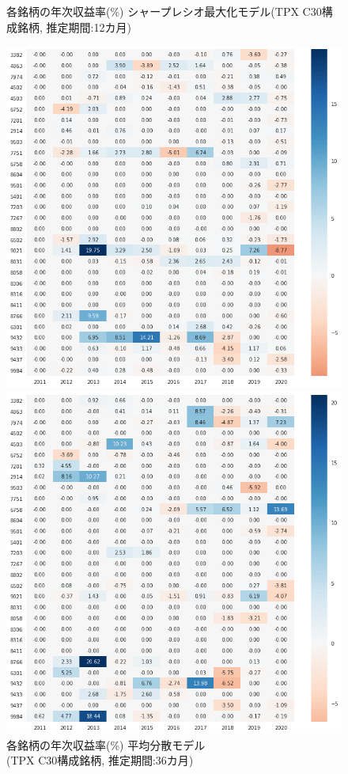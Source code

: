 \documentclass[dvipdfmx,autodetect-engine]{jsarticle}
\begin{document}
\begin{figure}[htbp]
\begin{minipage}{0.5\hsize}
\begin{center}
\end{center}
\caption{\small 各銘柄の年次収益率(\%) シャープレシオ最大化モデル(TPX C30構成銘柄, 推定期間:12カ月)}
\label{fig:12}
\end{minipage}
\begin{minipage}{0.5\hsize}
\begin{center}
\includegraphics[width=0.8\hsize]{./figures/mmvp_tpx30_w=36_hm.png}
\end{center}
\caption{\small 各銘柄の年次収益率(\%) 平均分散モデル\\(TPX C30構成銘柄, 推定期間:36カ月)}
\label{fig:21}
\end{minipage}
\begin{minipage}{0.5\hsize}
\begin{center}
\includegraphics[width=0.8\hsize]{./figures/srmp_tpx30_w=36_hm.png}

\end{center}
\end{minipage}
\end{figure}
\end{document}

